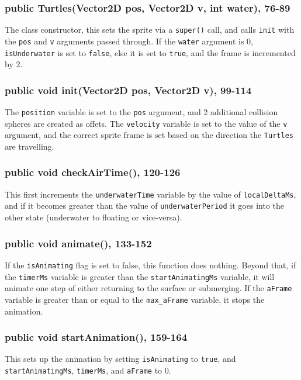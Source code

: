 \documentclass[12pt]{article}
\begin{document}
\subsubsection{public Turtles(Vector2D pos, Vector2D v, int water), 76-89}
The class constructor, this sets the sprite via a \verb|super()| call, and calls \verb|init| with the \verb|pos| and \verb|v| arguments passed through.
If the \verb|water| argument is 0, \verb|isUnderwater| is set to \verb|false|, else it is set to \verb|true|, and the frame is incremented by 2.

\subsubsection{public void init(Vector2D pos, Vector2D v), 99-114}
The \verb|position| variable is set to the \verb|pos| argument, and 2 additional collision spheres are created as offets.
The \verb|velocity| variable is set to the value of the \verb|v| argument, and the correct sprite frame is set based on the direction the \verb|Turtles| are travelling.

\subsubsection{public void checkAirTime(), 120-126}
This first increments the \verb|underwaterTime| variable by the value of \verb|localDeltaMs|, and if it becomes greater than the value of \verb|underwaterPeriod| it goes into the other state (underwater to floating or vice-versa).

\subsubsection{public void animate(), 133-152}
If the \verb|isAnimating| flag is set to false, this function does nothing.
Beyond that, if the \verb|timerMs| variable is greater than the \verb|startAnimatingMs| variable, it will animate one step of either returning to the surface or submerging.
If the \verb|aFrame| variable is greater than or equal to the \verb|max_aFrame| variable, it stops the animation.

\subsubsection{public void startAnimation(), 159-164}
This sets up the animation by setting \verb|isAnimating| to \verb|true|, and \verb|startAnimatingMs|, \verb|timerMs|, and \verb|aFrame| to 0.
\end{document}
